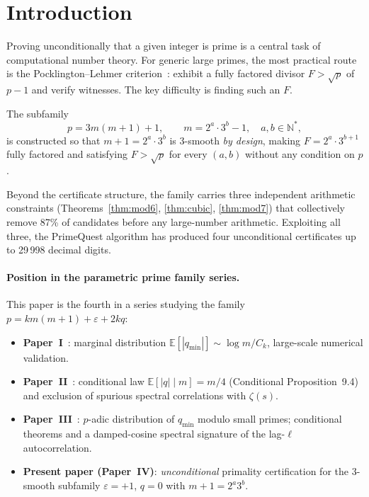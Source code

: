 \documentclass[11pt,a4paper]{article}
\theoremstyle{plain}
\theoremstyle{definition}
\begin{document}
\section{Introduction}
\label{sec:intro}

Proving unconditionally that a given integer is prime is a central task of
computational number theory. For generic large primes, the most practical
route is the Pocklington--Lehmer criterion~\cite{pock,brillhart}: exhibit a
fully factored divisor $F > \sqrt{p}$ of $p - 1$ and verify witnesses. The key
difficulty is finding such an $F$.

The subfamily
\[
p = 3m(m+1) + 1, \qquad m = 2^a \cdot 3^b - 1, \quad a, b \in \mathbb{N}^*,
\]
is constructed so that $m + 1 = 2^a \cdot 3^b$ is 3-smooth \emph{by design},
making $F = 2^a \cdot 3^{b+1}$ fully factored and satisfying $F > \sqrt{p}$
for every $(a, b)$ without any condition on $p$.

Beyond the certificate structure, the family carries three independent
arithmetic constraints (Theorems~\ref{thm:mod6}, \ref{thm:cubic},
\ref{thm:mod7}) that collectively remove 87\% of candidates before any
large-number arithmetic. Exploiting all three, the PrimeQuest algorithm has
produced four unconditional certificates up to 29\,998 decimal digits.

\paragraph{Position in the parametric prime family series.}
This paper is the fourth in a series studying the family
$p = km(m+1) + \varepsilon + 2kq$:
\begin{itemize}[leftmargin=*]
\item \textbf{Paper~I}~\cite{paper1}: marginal distribution
$\mathbb{E}[|q_{\min}|] \sim \log m / C_k$, large-scale numerical validation.
\item \textbf{Paper~II}~\cite{paper2}: conditional law
$\mathbb{E}[|q| \mid m] = m/4$ (Conditional Proposition~9.4) and exclusion of
spurious spectral correlations with $\zeta(s)$.
\item \textbf{Paper~III}~\cite{paper3}: $p$-adic distribution of $q_{\min}$
modulo small primes; conditional theorems and a damped-cosine spectral
signature of the lag-$\ell$ autocorrelation.
\item \textbf{Present paper (Paper~IV)}: \emph{unconditional} primality
certification for the 3-smooth subfamily $\varepsilon = +1$, $q = 0$ with
$m + 1 = 2^a 3^b$.
\end{itemize}
\end{document}
